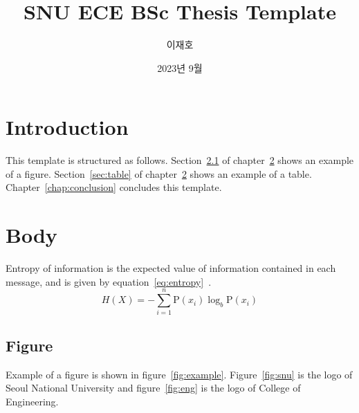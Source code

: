 \documentclass[en]{snu-ece-bsc-thesis}
\title{SNU ECE BSc Thesis Template}
\author{이재호}
\date{2023년 9월}
\begin{document}
\maketitle

\begin{abstract}
  \lipsum[1]
\end{abstract}

\tableofcontents
\listoftables
\listoffigures

\chapter{Introduction}\label{chap:introduction}
This template is structured as follows.
Section~\ref{sec:figure} of chapter~\ref{chap:body} shows an example of a figure.
Section~\ref{sec:table} of chapter~\ref{chap:body} shows an example of a table.
Chapter~\ref{chap:conclusion} concludes this template.

\lipsum[2-3]


\chapter{Body}\label{chap:body}
Entropy of information is the expected value of information contained in each message, and is given by equation~\eqref{eq:entropy}~\cite{6773024}.
\begin{equation}\label{eq:entropy}
  H(X) = -\sum_{i=1}^n {\mathrm{P}(x_i) \log_b \mathrm{P}(x_i)}
\end{equation}

\lipsum[4-6]


\section{Figure}\label{sec:figure}
Example of a figure is shown in figure~\ref{fig:example}.
Figure~\ref{fig:snu} is the logo of Seoul National University and figure~\ref{fig:eng} is the logo of College of Engineering.
\end{document}
